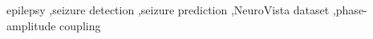 \begin{keyword}
epilepsy \sep seizure detection \sep seizure prediction \sep NeuroVista dataset \sep phase-amplitude coupling 
\end{keyword}
